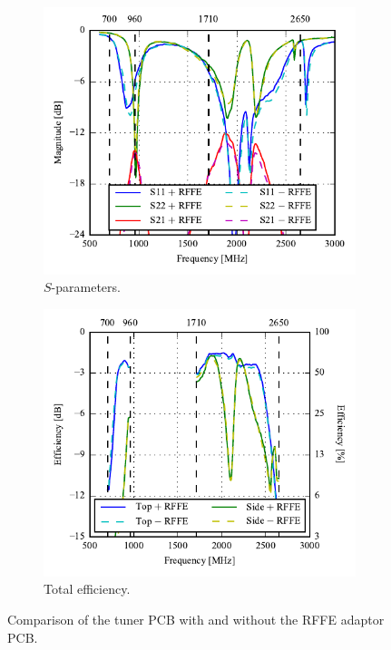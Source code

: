 \begin{figure}[htbp]
    \centering
    \begin{subfigure}[t]{0.49\linewidth}
        \includegraphics{img/optical_rffe/compare_sparams}
        \caption{$S$-parameters.} 
    \end{subfigure}
    \hfill
    \begin{subfigure}[t]{0.49\linewidth}
        \includegraphics{img/optical_rffe/compare_efficiency}
        \caption{Total efficiency.} 
    \end{subfigure}
    \caption{Comparison of the tuner PCB with and without the RFFE adaptor PCB.}
    \label{fig:rffe_test_results}
\end{figure}

